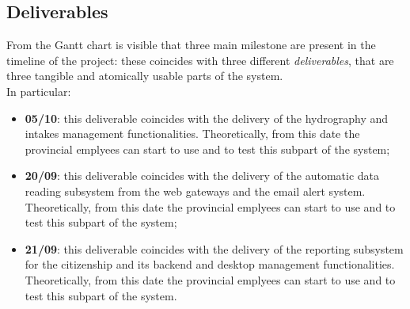 \subsection{Deliverables}
From the Gantt chart is visible that three main milestone are present in the timeline of the project: these coincides with three different \textit{deliverables}, that are three tangible and atomically usable parts of the system.\\
In particular:
\begin{itemize}
    \item \textbf{05/10}: this deliverable coincides with the delivery of the hydrography and intakes management functionalities. Theoretically, from this date the provincial emplyees can start to use and to test this subpart of the system;
    \item \textbf{20/09}: this deliverable coincides with the delivery of the automatic data reading subsystem from the web gateways and the email alert system. Theoretically, from this date the provincial emplyees can start to use and to test this subpart of the system;
    \item \textbf{21/09}: this deliverable coincides with the delivery of the reporting subsystem for the citizenship and its backend and desktop management functionalities. Theoretically, from this date the provincial emplyees can start to use and to test this subpart of the system.
\end{itemize}